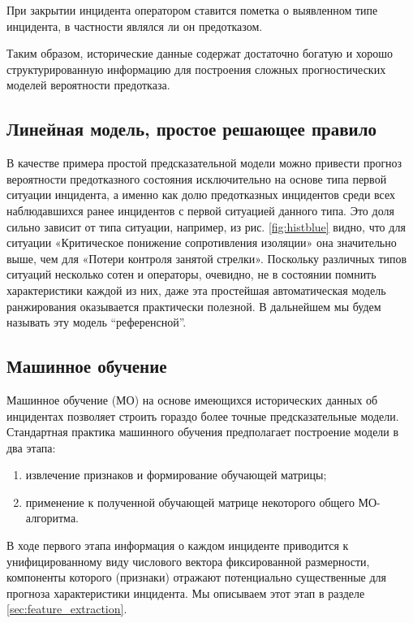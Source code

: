 При закрытии инцидента оператором ставится пометка о выявленном типе инцидента, в частности являлся ли он предотказом. 

Таким образом, исторические данные содержат достаточно богатую и хорошо структурированную информацию для построения сложных прогностических моделей вероятности предотказа.    

\subsection{Линейная модель, простое решающее правило}\label{sec:ref_model} 

В качестве примера простой предсказательной модели можно привести прогноз вероятности предотказного состояния исключительно на основе типа первой ситуации инцидента, а именно как долю предотказных инцидентов среди всех наблюдавшихся ранее инцидентов с первой ситуацией данного типа. Это доля сильно зависит от типа ситуации, например, из рис. \ref{fig:histblue} видно, что для ситуации «Критическое понижение сопротивления изоляции» она значительно выше, чем для «Потери контроля занятой стрелки». Поскольку различных типов ситуаций несколько сотен и операторы, очевидно, не в состоянии помнить характеристики каждой из них, даже эта простейшая автоматическая модель ранжирования оказывается практически полезной. В дальнейшем мы будем называть эту модель ``референсной''.  

\subsection{Машинное обучение}
Машинное обучение (МО)  на основе имеющихся исторических данных об инцидентах позволяет строить гораздо более точные предсказательные модели. Стандартная практика машинного обучения \cite{hastie01statisticallearning, Mitchell:1997:ML:541177, scikit-learn} предполагает построение модели в два этапа:
\begin{enumerate}
\item извлечение признаков и формирование обучающей матрицы;
\item применение к полученной обучающей матрице некоторого общего МО-алгоритма.
\end{enumerate}
В ходе первого этапа информация о каждом инциденте приводится к унифицированному виду числового вектора фиксированной размерности, компоненты которого (признаки) отражают потенциально существенные для прогноза характеристики инцидента. Мы описываем этот этап в разделе \ref{sec:feature_extraction}.

